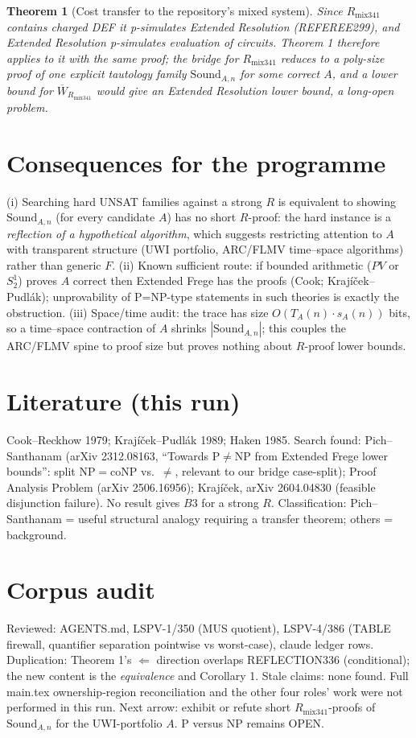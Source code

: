 \documentclass[11pt]{article}
\newtheorem{theorem}{Theorem}\newtheorem{corollary}{Corollary}
\begin{document}
\begin{theorem}[Cost transfer to the repository's mixed system]
Since $R_{\mathrm{mix341}}$ contains charged DEF it p-simulates Extended Resolution (REFEREE299), and Extended Resolution p-simulates evaluation of circuits. Theorem 1 therefore applies to it with the same proof; the bridge for $R_{\mathrm{mix341}}$ reduces to a poly-size proof of one explicit tautology family $\mathrm{Sound}_{A,n}$ for \emph{some} correct $A$, and a lower bound for $\overline W_{R_{\mathrm{mix341}}}$ would give an Extended Resolution lower bound, a long-open problem.
\end{theorem}

\section*{Consequences for the programme}
(i) Searching hard UNSAT families against a strong $R$ is equivalent to showing $\mathrm{Sound}_{A,n}$ (for every candidate $A$) has no short $R$-proof: the hard instance is a \emph{reflection of a hypothetical algorithm}, which suggests restricting attention to $A$ with transparent structure (UWI portfolio, ARC/FLMV time--space algorithms) rather than generic $F$. (ii) Known sufficient route: if bounded arithmetic ($PV$ or $S^1_2$) proves $A$ correct then Extended Frege has the proofs (Cook; Krajíček--Pudlák); unprovability of P=NP-type statements in such theories is exactly the obstruction. (iii) Space/time audit: the trace has size $O(T_A(n)\cdot s_A(n))$ bits, so a time--space contraction of $A$ shrinks $|\mathrm{Sound}_{A,n}|$; this couples the ARC/FLMV spine to proof size but proves nothing about $R$-proof lower bounds.

\section*{Literature (this run)}
Cook--Reckhow 1979; Krajíček--Pudlák 1989; Haken 1985. Search found: Pich--Santhanam (arXiv 2312.08163, ``Towards P$\ne$NP from Extended Frege lower bounds'': split NP$=$coNP vs.\ $\ne$, relevant to our bridge case-split); Proof Analysis Problem (arXiv 2506.16956); Krajíček, arXiv 2604.04830 (feasible disjunction failure). No result gives $B3$ for a strong $R$. Classification: Pich--Santhanam = useful structural analogy requiring a transfer theorem; others = background.

\section*{Corpus audit}
Reviewed: AGENTS.md, LSPV-1/350 (MUS quotient), LSPV-4/386 (TABLE firewall, quantifier separation pointwise vs worst-case), claude ledger rows. Duplication: Theorem 1's $\Leftarrow$ direction overlaps REFLECTION336 (conditional); the new content is the \emph{equivalence} and Corollary 1. Stale claims: none found. Full main.tex ownership-region reconciliation and the other four roles' work were not performed in this run. Next arrow: exhibit or refute short $R_{\mathrm{mix341}}$-proofs of $\mathrm{Sound}_{A,n}$ for the UWI-portfolio $A$. P versus NP remains OPEN.
\end{document}
